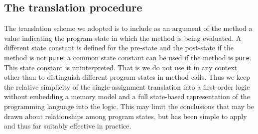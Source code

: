 \documentclass{sig-alternate}
\begin{document}
\subsection{The translation procedure}

The translation scheme we adopted is to include as an argument of the 
method a value indicating the
program state in which the method is being evaluated.  A different state constant is defined
for the pre-state and the post-state if the method is not \texttt{pure}; a common state
constant can be used if the method is \texttt{pure}.  This state constant is uninterpreted.
That is we do not use it in any context other than to distinguish different program states 
in method calls.
Thus we keep the relative simplicity of the single-assignment translation into a first-order
logic without embedding a memory model and 
a full state-based representation of the programming language into the 
logic.
This may limit the conclusions that may be drawn about relationships among 
program states, but has
been simple to apply and thus far suitably effective in practice.
\end{document}
